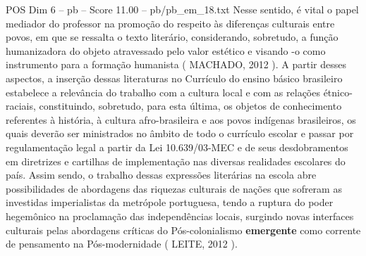 \begin{textsample}{POS Dim 6 – pb – Score 11.00 – pb/pb\_em\_18.txt}
Nesse sentido, é vital o papel mediador do professor na promoção do respeito às diferenças culturais entre povos, em que se ressalta o texto literário, considerando, sobretudo, a função humanizadora do objeto atravessado pelo valor estético e visando -o como instrumento para a formação humanista ( MACHADO, 2012 ).
A partir desses aspectos, a inserção dessas literaturas no Currículo do ensino básico brasileiro estabelece a relevância do trabalho com a cultura local e com as relações étnico-raciais, constituindo, sobretudo, para esta última, os objetos de conhecimento referentes à história, à cultura afro-brasileira e aos povos indígenas brasileiros, os quais deverão ser ministrados no âmbito de todo o currículo escolar e passar por regulamentação legal a partir da Lei 10.639/03-MEC e de seus desdobramentos em diretrizes e cartilhas de implementação nas diversas realidades escolares do país.
Assim sendo, o trabalho dessas expressões literárias na escola abre possibilidades de abordagens das riquezas culturais de nações que sofreram as investidas imperialistas da metrópole portuguesa, tendo a ruptura do poder hegemônico na proclamação das independências locais, surgindo novas interfaces culturais pelas abordagens críticas do Pós-colonialismo \textbf{emergente} como corrente de pensamento na Pós-modernidade ( LEITE, 2012 ).

\end{textsample}
